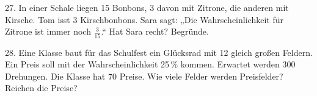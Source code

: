 \documentclass[11pt]{article}
\begin{document}
\begin{pfaufg}{}{27.}{}
In einer Schale liegen 15 Bonbons, 3 davon mit Zitrone, die anderen mit Kirsche. Tom isst 3 Kirschbonbons. Sara sagt: „Die Wahrscheinlichkeit für Zitrone ist immer noch $\frac{3}{15}$.“ Hat Sara recht? Begründe.
\end{pfaufg}

\begin{pfaufg}{}{28.}{}
Eine Klasse baut für das Schulfest ein Glücksrad mit 12 gleich großen Feldern. Ein Preis soll mit der Wahrscheinlichkeit 25\,\% kommen. Erwartet werden 300 Drehungen. Die Klasse hat 70 Preise. Wie viele Felder werden Preisfelder? Reichen die Preise?
\end{pfaufg}

\par\vfill{}
\end{document}
